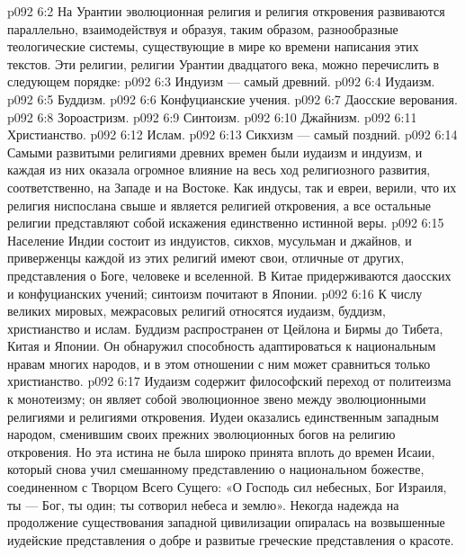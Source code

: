 \vs p092 6:2 \pc На Урантии эволюционная религия и религия откровения развиваются параллельно, взаимодействуя и образуя, таким образом, разнообразные теологические системы, существующие в мире ко времени написания этих текстов. Эти религии, религии Урантии двадцатого века, можно перечислить в следующем порядке:
\vs p092 6:3 \bibnobreakspace Индуизм --- самый древний.
\vs p092 6:4 \bibnobreakspace Иудаизм.
\vs p092 6:5 \bibnobreakspace Буддизм.
\vs p092 6:6 \bibnobreakspace Конфуцианские учения.
\vs p092 6:7 \bibnobreakspace Даосские верования.
\vs p092 6:8 \bibnobreakspace Зороастризм.
\vs p092 6:9 \bibnobreakspace Синтоизм.
\vs p092 6:10 \bibnobreakspace Джайнизм.
\vs p092 6:11 \bibnobreakspace Христианство.
\vs p092 6:12 \bibnobreakspace Ислам.
\vs p092 6:13 \bibnobreakspace Сикхизм --- самый поздний.
\vs p092 6:14 \pc Самыми развитыми религиями древних времен были иудаизм и индуизм, и каждая из них оказала огромное влияние на весь ход религиозного развития, соответственно, на Западе и на Востоке. Как индусы, так и евреи, верили, что их религия ниспослана свыше и является религией откровения, а все остальные религии представляют собой искажения единственно истинной веры.
\vs p092 6:15 Население Индии состоит из индуистов, сикхов, мусульман и джайнов, и приверженцы каждой из этих религий имеют свои, отличные от других, представления о Боге, человеке и вселенной. В Китае придерживаются даосских и конфуцианских учений; синтоизм почитают в Японии.
\vs p092 6:16 К числу великих мировых, межрасовых религий относятся иудаизм, буддизм, христианство и ислам. Буддизм распространен от Цейлона и Бирмы до Тибета, Китая и Японии. Он обнаружил способность адаптироваться к национальным нравам многих народов, и в этом отношении с ним может сравниться только христианство.
\vs p092 6:17 Иудаизм содержит философский переход от политеизма к монотеизму; он являет собой эволюционное звено между эволюционными религиями и религиями откровения. Иудеи оказались единственным западным народом, сменившим своих прежних эволюционных богов на религию откровения. Но эта истина не была широко принята вплоть до времен Исаии, который снова учил смешанному представлению о национальном божестве, соединенном с Творцом Всего Сущего: «О Господь сил небесных, Бог Израиля, ты --- Бог, ты один; ты сотворил небеса и землю». Некогда надежда на продолжение существования западной цивилизации опиралась на возвышенные иудейские представления о добре и развитые греческие представления о красоте.
